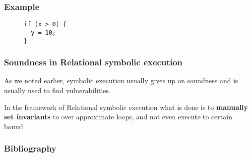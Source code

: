 \documentclass{beamer}
\begin{document}
\begin{frame}[fragile]
  \frametitle{Example}
  \begin{figure}[htp]
  \centering
  \begin{verbatim}
if (x > 0) {
  y = 10;
}
  \end{verbatim}
  \end{figure}
  \begin{figure}
  \end{figure}
\end{frame}

\begin{frame}
  \frametitle{Soundness in Relational symbolic execution}
  As we noted earlier, symbolic execution usually gives up on soundness and is usually used to find
  vulnerabilities.

  \vspace{1em}
  In the framework of Relational symbolic execution what is done is to \textbf{manually set invariants}
  to over approximate loops, and not even execute to certain bound.
\end{frame}



\begin{frame}[allowframebreaks]
\frametitle{Bibliography}

\end{frame}
\end{document}
